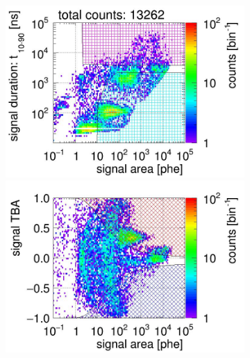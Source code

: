 \begin{landscape}%
	\begin{figure}[!p]
		\centering
		\begin{subfigure}[t]{0.32\textwidth} %
			\centering
			\includegraphics[width=\figurewidth,clip,trim={0 98 0 15}]{Figures/GasTest/CutsValid/res64765/pdpa22Vecfig64765.jpg}
			\includegraphics[width=\figurewidth,clip,trim={0 8 0 40}]{Figures/GasTest/CutsValid/res64765/tbapa22Vecfig64765.jpg}
			\caption{}
			\label{fig:signal selection dv 08 01}
		\end{subfigure}
		\begin{subfigure}[t]{0.32\textwidth}
			\centering

\end{subfigure}
\end{figure}
\end{landscape}
